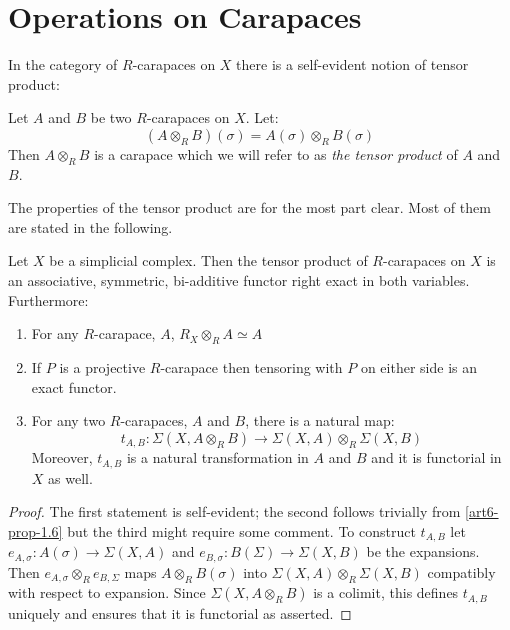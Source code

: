 \section{Operations on Carapaces}\label{art6-sec-2}

In the category of $R$-carapaces on $X$ there is a self-evident notion of tensor product:

\begin{definition}\label{art6-definition-2.1}
Let $A$ and $B$ be two $R$-carapaces on $X$. Let:
$$
(A \otimes_{R} B)(\sigma) = A(\sigma) \otimes_{R}B(\sigma)
$$
Then $A\otimes_{R}B$ is a carapace which we will refer to as \textit{the tensor product} of $A$ and $B$.

The properties of the tensor product are for the most part clear. Most of them are stated in the following.
\end{definition}

\begin{prop}\label{art6-prop-2.2}
Let $X$ be a simplicial complex. Then the tensor product of $R$-carapaces on $X$ is an associative, symmetric, bi-additive functor right exact in both variables. Furthermore:
   \begin{enumerate}[(1)]
   \item For any $R$-carapace, $A$, $R_{X}\otimes_{R}A \simeq A$\label{art6-prop2.2-enum-(1)}
   \item If $P$ is a projective $R$-carapace then tensoring with $P$ on either side is 
   an exact functor.\label{art6-prop2.2-enum-(2)}
   \item For any two $R$-carapaces, $A$ and $B$, there is a natural map:
      $$
      t_{A, B}:\Sigma(X, A\otimes_{R}B)\rightarrow \Sigma(X, A)\otimes_{R}\Sigma(X, B)
      $$
      Moreover, $t_{A, B}$ is a natural transformation in $A$ and $B$ and it is functorial in $X$ as well.\label{art6-prop2.2-enum-(3)}
   \end{enumerate}
\end{prop}

\begin{proof}
The first statement is self-evident; the second follows trivially from \ref{art6-prop-1.6} but the third might require some comment. To construct $t_{A, B}$ let $e_{A, \sigma} : A(\sigma) \rightarrow \Sigma(X, A)$ and $e_{B, \sigma} : B(\Sigma) \rightarrow \Sigma(X, B)$ be the expansions. Then $e_{A, \sigma} \otimes_{R} e_{B, \Sigma}$ maps $A\otimes_{R} B(\sigma)$ into $\Sigma(X, A) \otimes_{R} \Sigma(X, B)$ compatibly with respect to expansion. Since $\Sigma(X, A \otimes_{R} B)$ is a colimit, this defines $t_{A, B}$ uniquely and ensures that it is functorial as asserted. 
\end{proof}

